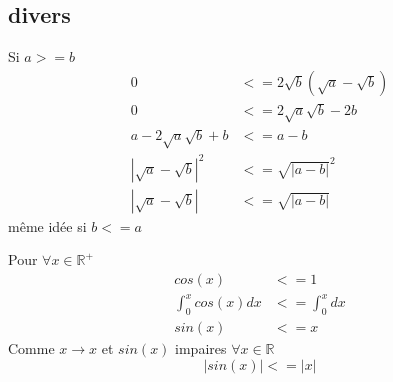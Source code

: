 \documentclass[a4paper,10pt]{article}
\begin{document}
\subsection{divers}
Si $a >= b$
\begin{align*}
 0 &<= 2\sqrt{b}(\sqrt{a} - \sqrt{b})\\
 0 &<= 2\sqrt{a}\sqrt{b} -2b\\
 a - 2\sqrt{a}\sqrt{b} + b &<=  a - b\\
 |\sqrt{a} - \sqrt{b}|^{2} &<= \sqrt{|a - b|}^2\\
 |\sqrt{a} - \sqrt{b}| &<= \sqrt{|a - b|}
\end{align*}
même idée si $b <= a$


Pour $\forall x \in \mathbb{R}^{+}$
\begin{align*}
 cos(x) &<= 1\\
 \int_{0}^{x} cos(x) dx&<= \int_{0}^{x} dx\\
 sin(x) &<= x
\end{align*}
Comme $x \longrightarrow x$ et $sin(x)$ impaires $\forall x \in \mathbb{R}$ 
\[|sin(x)| <= |x|\]
\end{document}

